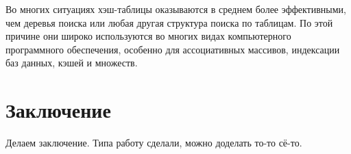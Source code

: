 Во многих ситуациях хэш-таблицы оказываются в среднем более эффективными, чем деревья поиска или любая другая структура поиска по таблицам. 
По этой причине они широко используются во многих видах компьютерного программного обеспечения, особенно для ассоциативных массивов, индексации баз данных, кэшей и множеств.

\newpage
\section*{Заключение}
Делаем заключение. Типа работу сделали, можно доделать то-то сё-то.
